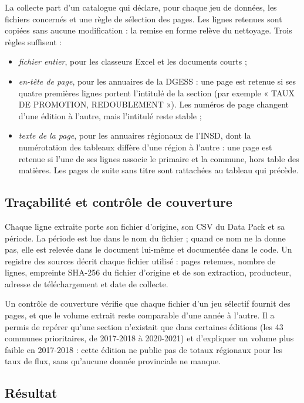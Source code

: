 \documentclass{article}
\begin{document}
La collecte part d'un catalogue qui déclare, pour chaque jeu de données, les fichiers concernés et une règle de sélection des pages. Les lignes retenues sont copiées sans aucune modification : la remise en forme relève du nettoyage. Trois règles suffisent :
\begin{itemize}
\item \emph{fichier entier}, pour les classeurs Excel et les documents courts ;
\item \emph{en-tête de page}, pour les annuaires de la DGESS : une page est retenue si ses quatre premières lignes portent l'intitulé de la section (par exemple « TAUX DE PROMOTION, REDOUBLEMENT »). Les numéros de page changent d'une édition à l'autre, mais l'intitulé reste stable ;
\item \emph{texte de la page}, pour les annuaires régionaux de l'INSD, dont la numérotation des tableaux diffère d'une région à l'autre : une page est retenue si l'une de ses lignes associe le primaire et la commune, hors table des matières. Les pages de suite sans titre sont rattachées au tableau qui précède.
\end{itemize}

\subsection{Traçabilité et contrôle de couverture}

Chaque ligne extraite porte son fichier d'origine, son CSV du Data Pack et sa période. La période est lue dans le nom du fichier ; quand ce nom ne la donne pas, elle est relevée dans le document lui-même et documentée dans le code. Un registre des sources décrit chaque fichier utilisé : pages retenues, nombre de lignes, empreinte SHA-256 du fichier d'origine et de son extraction, producteur, adresse de téléchargement et date de collecte.

Un contrôle de couverture vérifie que chaque fichier d'un jeu sélectif fournit des pages, et que le volume extrait reste comparable d'une année à l'autre. Il a permis de repérer qu'une section n'existait que dans certaines éditions (les 43 communes prioritaires, de 2017-2018 à 2020-2021) et d'expliquer un volume plus faible en 2017-2018 : cette édition ne publie pas de totaux régionaux pour les taux de flux, sans qu'aucune donnée provinciale ne manque.

\subsection{Résultat}
\end{document}
